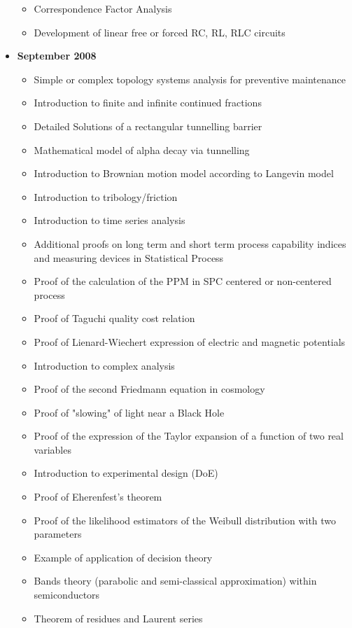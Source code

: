 \documentclass[12pt,a4paper,twoside,openright]{report}
\theoremstyle{definition}
\theoremstyle{itexmp}
\numberwithin{equation}{section}
\begin{document}
\begin{itemize}
\begin{itemize}[noitemsep]
			\item Correspondence Factor Analysis
			\item Development of linear free or forced RC, RL, RLC circuits
		\end{itemize}
	\item \textbf{September 2008}
		\begin{itemize}[noitemsep]
			\item Simple or complex topology systems analysis for preventive maintenance
			\item Introduction to finite and infinite continued fractions
			\item Detailed Solutions of a rectangular tunnelling barrier
			\item Mathematical model of alpha decay via tunnelling
			\item Introduction to Brownian motion model according to Langevin model
			\item Introduction to tribology/friction
			\item Introduction to time series analysis
			\item Additional proofs on long term and short term process capability indices and measuring devices in Statistical Process
			\item Proof of the calculation of the PPM in SPC centered or non-centered process
			\item Proof of Taguchi quality cost relation
			\item Proof of Lienard-Wiechert expression of electric and magnetic potentials 
			\item Introduction to complex analysis
			\item Proof of the second Friedmann equation in cosmology
			\item Proof of "slowing" of light near a Black Hole
			\item Proof of the expression of the Taylor expansion of a function of two real variables
			\item Introduction to experimental design (DoE)
			\item Proof of Eherenfest's theorem
			\item Proof of the likelihood estimators of the Weibull distribution with two parameters
			\item Example of application of decision theory
			\item Bands theory (parabolic and semi-classical approximation) within semiconductors
			\item Theorem of residues and Laurent series

\end{itemize}
\end{itemize}
\end{document}
